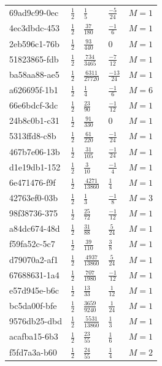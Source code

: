 \documentclass[11pt,twoside,openright]{book}
\begin{document}
\begin{longtable}{p{4.5cm}llll}
69ad9c99-0ec & $\frac{1}{2}$ & $\frac{1}{5}$ & $\frac{-5}{24}$ & $M=1$ \\
4ec3dbdc-453 & $\frac{1}{2}$ & $\frac{37}{180}$ & $\frac{-1}{6}$ & $M=1$ \\
2eb596c1-76b & $\frac{1}{2}$ & $\frac{93}{440}$ & $0$ & $M=1$ \\
51823865-fdb & $\frac{1}{2}$ & $\frac{734}{3465}$ & $\frac{-7}{12}$ & $M=1$ \\
ba58aa88-ae5 & $\frac{1}{2}$ & $\frac{6311}{27720}$ & $\frac{-13}{24}$ & $M=1$ \\
a626695f-1b1 & $\frac{1}{2}$ & $\frac{1}{4}$ & $\frac{-1}{6}$ & $M=6$ \\
66e6bdcf-3dc & $\frac{1}{2}$ & $\frac{23}{90}$ & $\frac{-1}{12}$ & $M=1$ \\
24b8c0b1-c31 & $\frac{1}{2}$ & $\frac{91}{330}$ & $0$ & $M=1$ \\
5313ffd8-c8b & $\frac{1}{2}$ & $\frac{61}{220}$ & $\frac{-1}{24}$ & $M=1$ \\
467b7e06-13b & $\frac{1}{2}$ & $\frac{31}{105}$ & $\frac{-1}{24}$ & $M=1$ \\
d1e19db1-152 & $\frac{1}{2}$ & $\frac{3}{10}$ & $\frac{-1}{4}$ & $M=1$ \\
6e471476-f9f & $\frac{1}{2}$ & $\frac{4271}{13860}$ & $\frac{1}{4}$ & $M=1$ \\
42763ef0-03b & $\frac{1}{2}$ & $\frac{1}{3}$ & $\frac{-1}{8}$ & $M=3$ \\
98f38736-375 & $\frac{1}{2}$ & $\frac{25}{72}$ & $\frac{-1}{12}$ & $M=1$ \\
a84dc674-48d & $\frac{1}{2}$ & $\frac{31}{88}$ & $\frac{5}{24}$ & $M=1$ \\
f59fa52c-5c7 & $\frac{1}{2}$ & $\frac{39}{110}$ & $\frac{3}{8}$ & $M=1$ \\
d79070a2-af1 & $\frac{1}{2}$ & $\frac{4937}{13860}$ & $\frac{5}{24}$ & $M=1$ \\
67688631-1a4 & $\frac{1}{2}$ & $\frac{707}{1980}$ & $\frac{-1}{12}$ & $M=1$ \\
e57d945e-b6c & $\frac{1}{2}$ & $\frac{13}{33}$ & $\frac{1}{12}$ & $M=1$ \\
bc5da00f-bfe & $\frac{1}{2}$ & $\frac{3659}{9240}$ & $\frac{1}{24}$ & $M=1$ \\
9576db25-dbd & $\frac{1}{2}$ & $\frac{5531}{13860}$ & $\frac{1}{3}$ & $M=1$ \\
acafba15-6b3 & $\frac{1}{2}$ & $\frac{23}{55}$ & $\frac{1}{6}$ & $M=1$ \\
f5fd7a3a-b60 & $\frac{1}{2}$ & $\frac{24}{55}$ & $\frac{1}{4}$ & $M=2$ \\

\end{longtable}
\end{document}
